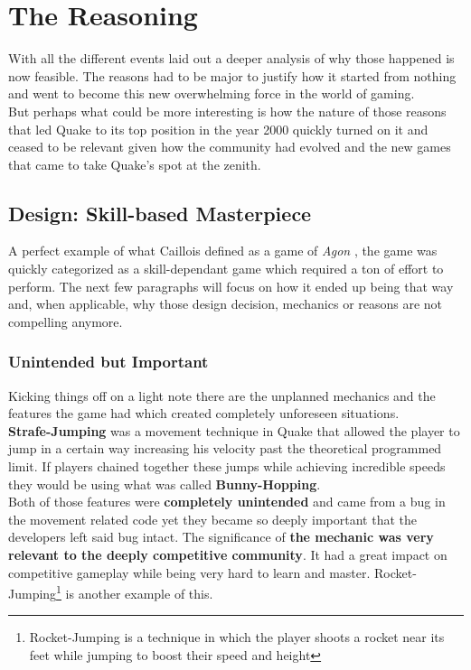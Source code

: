 \section{The Reasoning}
\label{sec::reasoning}

With all the different events laid out a deeper analysis of why those happened is now feasible. The reasons had to be major to justify how it started from nothing and went to become this new overwhelming force in the world of gaming.\\

But perhaps what could be more interesting is how the nature of those reasons that led Quake to its top position in the year 2000 quickly turned on it and ceased to be relevant given how the community had evolved and the new games that came to take Quake's spot at the zenith.\\

\subsection{Design: Skill-based Masterpiece}

A perfect example of what Caillois defined as a game of \textit{Agon} \citep{caillois1961man}, the game was quickly categorized as a skill-dependant game which required a ton of effort to perform. The next few paragraphs will focus on how it ended up being that way and, when applicable, why those design decision, mechanics or reasons are not compelling anymore.

\subsubsection{Unintended but Important}

Kicking things off on a light note there are the unplanned mechanics and the features the game had which created completely unforeseen situations.\\

\textbf{Strafe-Jumping} was a movement technique in Quake that allowed the player to jump in a certain way increasing his velocity past the theoretical programmed limit. If players chained together these jumps while achieving incredible speeds they would be using what was called \textbf{Bunny-Hopping}.\\

Both of those features were \textbf{completely unintended} and came from a bug in the movement related code yet they became so deeply important that the developers left said bug intact. The significance of \textbf{the mechanic was very relevant to the deeply competitive community}. It had a great impact on competitive gameplay while being very hard to learn and master. Rocket-Jumping\footnote{Rocket-Jumping is a technique in which the player shoots a rocket near its feet while jumping to boost their speed and height} is another example of this.\\


